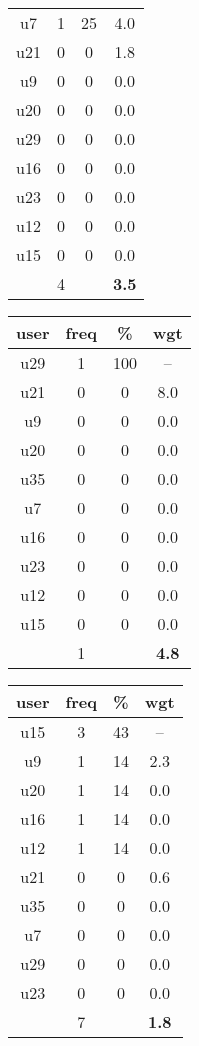 \begin{table}
\begin{tabular}{ |c|c|c|c| }
	u7 & 1 & 25 & 4.0 \\
	u21 & 0 & 0 & 1.8 \\
	u9 & 0 & 0 & 0.0 \\
	u20 & 0 & 0 & 0.0 \\
	u29 & 0 & 0 & 0.0 \\
	u16 & 0 & 0 & 0.0 \\
	u23 & 0 & 0 & 0.0 \\
	u12 & 0 & 0 & 0.0 \\
	u15 & 0 & 0 & 0.0 \\
	 & 4 & & \textbf{3.5} \\
	\hline
\end{tabular}
\begin{tabular}{ |c|c|c|c| }
	\hline
	\textbf{user} & \textbf{freq} & \textbf{\%} & \textbf{wgt} \\
	\hline
	u29 & 1 & 100 & -- \\
	u21 & 0 & 0 & 8.0 \\
	u9 & 0 & 0 & 0.0 \\
	u20 & 0 & 0 & 0.0 \\
	u35 & 0 & 0 & 0.0 \\
	u7 & 0 & 0 & 0.0 \\
	u16 & 0 & 0 & 0.0 \\
	u23 & 0 & 0 & 0.0 \\
	u12 & 0 & 0 & 0.0 \\
	u15 & 0 & 0 & 0.0 \\
	 & 1 & & \textbf{4.8} \\
	\hline
\end{tabular}
\begin{tabular}{ |c|c|c|c| }
	\hline
	\textbf{user} & \textbf{freq} & \textbf{\%} & \textbf{wgt} \\
	\hline
	u15 & 3 & 43 & -- \\
	u9 & 1 & 14 & 2.3 \\
	u20 & 1 & 14 & 0.0 \\
	u16 & 1 & 14 & 0.0 \\
	u12 & 1 & 14 & 0.0 \\
	u21 & 0 & 0 & 0.6 \\
	u35 & 0 & 0 & 0.0 \\
	u7 & 0 & 0 & 0.0 \\
	u29 & 0 & 0 & 0.0 \\
	u23 & 0 & 0 & 0.0 \\
	 & 7 & & \textbf{1.8} \\
	\hline
\end{tabular}

\end{table}

